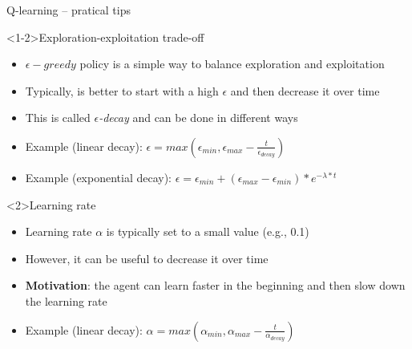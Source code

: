 \documentclass[presentation, 9pt]{beamer}\mode<presentation>{\usetheme{AMSBolognaFC}}
\begin{document}
\begin{frame}{Q-learning -- pratical tips}
	\begin{exampleblock}<1-2>{Exploration-exploitation trade-off}
		\begin{itemize}
			\item $\epsilon-greedy$ policy is a simple way to balance exploration and exploitation
			\item Typically, is better to start with a high $\epsilon$ and then decrease it over time
			\item This is called \emph{$\epsilon$-decay} and can be done in different ways
			\item Example (linear decay): $\epsilon = max(\epsilon_{min}, \epsilon_{max} - \frac{t}{\epsilon_{decay}})$
			\item Example (exponential decay): $\epsilon = \epsilon_{min} + (\epsilon_{max} - \epsilon_{min}) * e^{-\lambda * t}$
		\end{itemize}		
	\end{exampleblock}
	\begin{exampleblock}{Learning rate}
		\begin{itemize}
			\item Learning rate $\alpha$ is typically set to a small value (e.g., 0.1)
			\item However, it can be useful to decrease it over time 
			\item \textbf{Motivation}: the agent can learn faster in the beginning and then slow down the learning rate
			\item Example (linear decay): $\alpha = max(\alpha_{min}, \alpha_{max} - \frac{t}{\alpha_{decay}})$
		
		\end{itemize}
	\end{exampleblock}
\end{frame}
\end{document}
